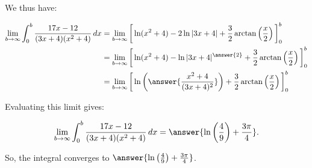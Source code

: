 \documentclass{ximera}
\begin{document}
\begin{exercise}
\begin{exercise}
\begin{exercise}
\begin{exercise}
We thus have:

\begin{align*}
\lim_{b\rightarrow \infty} \int_{0}^{b} \frac{17x-12}{(3x+4)(x^2+4)} \d x &= \lim_{b\rightarrow \infty} \eval{ \ln(x^2+4)-2 \ln|3x+4|+\frac{3}{2} \arctan\left(\frac{x}{2}\right)}_0^b  \\
&= \lim_{b\rightarrow \infty} \eval{ \ln(x^2+4)- \ln|3x+4|^{\answer{2}}+\frac{3}{2} \arctan\left(\frac{x}{2}\right)}_0^b \\
&= \lim_{b\rightarrow \infty} \eval{ \ln\left(\answer{\frac{x^2+4}{(3x+4)^2}}\right)+\frac{3}{2} \arctan\left(\frac{x}{2}\right)}_0^b
\end{align*}

Evaluating this limit gives:

\[ \lim_{b\rightarrow \infty} \int_{0}^{b} \frac{17x-12}{(3x+4)(x^2+4)} \d x  = \answer{\ln\left(\frac{4}{9}\right) + \frac{3 \pi}{4}  }.
\]

So, the integral converges to $\answer{\ln\left(\frac{4}{9}\right) + \frac{3 \pi}{4}  }$.
\end{exercise}
\end{exercise}
\end{exercise}









\end{exercise}
\end{document}

